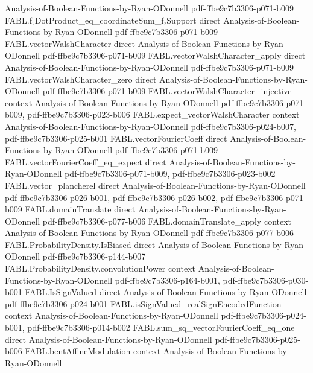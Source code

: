 \begin{theorem}
  {Analysis-of-Boolean-Functions-by-Ryan-ODonnell}
  {pdf-ffbe9c7b3306-p071-b009}
\proofstep
  {FABL.f₂DotProduct_eq_coordinateSum_f₂Support}
  {direct}
  {Analysis-of-Boolean-Functions-by-Ryan-ODonnell}
  {pdf-ffbe9c7b3306-p071-b009}
\proofstep
  {FABL.vectorWalshCharacter}
  {direct}
  {Analysis-of-Boolean-Functions-by-Ryan-ODonnell}
  {pdf-ffbe9c7b3306-p071-b009}
\proofstep
  {FABL.vectorWalshCharacter_apply}
  {direct}
  {Analysis-of-Boolean-Functions-by-Ryan-ODonnell}
  {pdf-ffbe9c7b3306-p071-b009}
\proofstep
  {FABL.vectorWalshCharacter_zero}
  {direct}
  {Analysis-of-Boolean-Functions-by-Ryan-ODonnell}
  {pdf-ffbe9c7b3306-p071-b009}
\proofstep
  {FABL.vectorWalshCharacter_injective}
  {context}
  {Analysis-of-Boolean-Functions-by-Ryan-ODonnell}
  {pdf-ffbe9c7b3306-p071-b009,
    pdf-ffbe9c7b3306-p023-b006}
\proofstep
  {FABL.expect_vectorWalshCharacter}
  {context}
  {Analysis-of-Boolean-Functions-by-Ryan-ODonnell}
  {pdf-ffbe9c7b3306-p024-b007,
    pdf-ffbe9c7b3306-p025-b001}
\proofstep
  {FABL.vectorFourierCoeff}
  {direct}
  {Analysis-of-Boolean-Functions-by-Ryan-ODonnell}
  {pdf-ffbe9c7b3306-p071-b009}
\proofstep
  {FABL.vectorFourierCoeff_eq_expect}
  {direct}
  {Analysis-of-Boolean-Functions-by-Ryan-ODonnell}
  {pdf-ffbe9c7b3306-p071-b009,
    pdf-ffbe9c7b3306-p023-b002}
\proofstep
  {FABL.vector_plancherel}
  {direct}
  {Analysis-of-Boolean-Functions-by-Ryan-ODonnell}
  {pdf-ffbe9c7b3306-p026-b001,
    pdf-ffbe9c7b3306-p026-b002,
    pdf-ffbe9c7b3306-p071-b009}
\proofstep
  {FABL.domainTranslate}
  {direct}
  {Analysis-of-Boolean-Functions-by-Ryan-ODonnell}
  {pdf-ffbe9c7b3306-p077-b006}
\proofstep
  {FABL.domainTranslate_apply}
  {context}
  {Analysis-of-Boolean-Functions-by-Ryan-ODonnell}
  {pdf-ffbe9c7b3306-p077-b006}
\proofstep
  {FABL.ProbabilityDensity.IsBiased}
  {direct}
  {Analysis-of-Boolean-Functions-by-Ryan-ODonnell}
  {pdf-ffbe9c7b3306-p144-b007}
\proofstep
  {FABL.ProbabilityDensity.convolutionPower}
  {context}
  {Analysis-of-Boolean-Functions-by-Ryan-ODonnell}
  {pdf-ffbe9c7b3306-p164-b001,
    pdf-ffbe9c7b3306-p030-b001}
\proofstep
  {FABL.IsSignValued}
  {direct}
  {Analysis-of-Boolean-Functions-by-Ryan-ODonnell}
  {pdf-ffbe9c7b3306-p024-b001}
\proofstep
  {FABL.isSignValued_realSignEncodedFunction}
  {context}
  {Analysis-of-Boolean-Functions-by-Ryan-ODonnell}
  {pdf-ffbe9c7b3306-p024-b001,
    pdf-ffbe9c7b3306-p014-b002}
\proofstep
  {FABL.sum_sq_vectorFourierCoeff_eq_one}
  {direct}
  {Analysis-of-Boolean-Functions-by-Ryan-ODonnell}
  {pdf-ffbe9c7b3306-p025-b006}
\proofstep
  {FABL.bentAffineModulation}
  {context}
  {Analysis-of-Boolean-Functions-by-Ryan-ODonnell}

\end{theorem}
